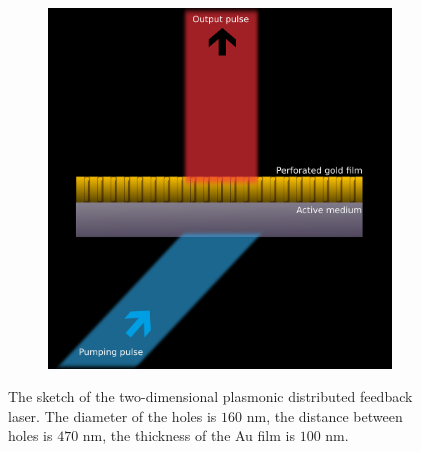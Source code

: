 \documentclass[aps,prapplied,amsmath,amssymb,onecolumn,superscriptaddress,showpacs,floatfix,longbibliography]{revtex4-1}
\begin{document}
\begin{figure}[!h]
	\centering
	\begin{subfigure}[h]{0.6\linewidth}
		\includegraphics[width=\linewidth]{Fig1.png}
	\end{subfigure}
	\caption{The sketch of the two-dimensional plasmonic distributed feedback laser. The diameter of the holes is $160$ $\text{nm}$, the distance between holes is $470$ $\text{nm}$, the thickness of the Au film is $100$ $\text{nm}$.}
	\label{fig1}
\end{figure}
\end{document}
